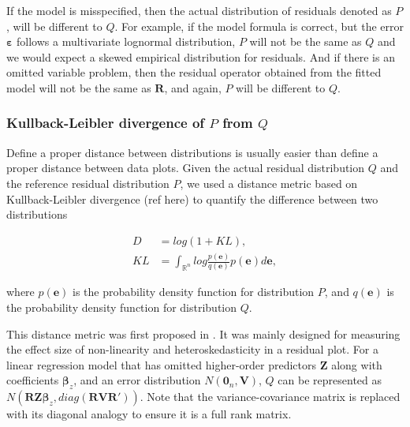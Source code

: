 \documentclass[]{interact}
\theoremstyle{plain}%
\theoremstyle{definition}
\theoremstyle{remark}
\begin{document}
If the model is misspecified, then the actual distribution of residuals
denoted as \(P\), will be different to \(Q\). For example, if the model
formula is correct, but the error \(\boldsymbol{\varepsilon}\) follows a
multivariate lognormal distribution, \(P\) will not be the same as \(Q\)
and we would expect a skewed empirical distribution for residuals. And
if there is an omitted variable problem, then the residual operator
obtained from the fitted model will not be the same as
\(\boldsymbol{R}\), and again, \(P\) will be different to \(Q\).

\hypertarget{kullback-leibler-divergence-of-p-from-q}{%
\subsubsection{\texorpdfstring{Kullback-Leibler divergence of \(P\) from
\(Q\)}{Kullback-Leibler divergence of P from Q}}\label{kullback-leibler-divergence-of-p-from-q}}

Define a proper distance between distributions is usually easier than
define a proper distance between data plots. Given the actual residual
distribution \(Q\) and the reference residual distribution \(P\), we
used a distance metric based on Kullback-Leibler divergence (ref here)
to quantify the difference between two distributions

\begin{align}
D &= log\left(1 + KL\right), \\
\label{eq:kl-1}
KL &= \int_{\mathbb{R}^{n}}log\frac{p(\boldsymbol{e})}{q(\boldsymbol{e})}p(\boldsymbol{e})d\boldsymbol{e},
\end{align}

\noindent where \(p(\boldsymbol{e})\) is the probability density
function for distribution \(P\), and \(q(\boldsymbol{e})\) is the
probability density function for distribution \(Q\).

This distance metric was first proposed in \citet{li2023plot}. It was
mainly designed for measuring the effect size of non-linearity and
heteroskedasticity in a residual plot. For a linear regression model
that has omitted higher-order predictors \(\boldsymbol{Z}\) along with
coefficients \(\boldsymbol{\beta}_z\), and an error distribution
\(N(\boldsymbol{0}_n, \boldsymbol{V})\), \(Q\) can be represented as
\(N(\boldsymbol{R}\boldsymbol{Z}\boldsymbol{\beta}_z, diag(\boldsymbol{R}\boldsymbol{V}\boldsymbol{R}'))\).
Note that the variance-covariance matrix is replaced with its diagonal
analogy to ensure it is a full rank matrix.
\end{document}
